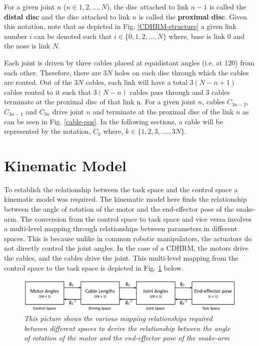 \documentclass[a4paper,12pt]{report}
\begin{document}
For a given joint $n$ ($n \in {1,2,\ldots,N}$), the disc attached to link $n-1$ is called the \textbf{distal disc} and the disc attached to link $n$ is called the \textbf{proximal disc}. Given this notation, note that as depicted in Fig. \ref{CDHRM-structure} a given link number $i$ can be denoted such that $i \in \{0,1,2,\ldots,N\}$ where, base is link $0$ and the nose is link $N$.


Each joint is driven by three cables placed at equidistant angles (i.e. at 120\textdegree) from each other. Therefore, there are $3N$ holes on each disc through which the cables are routed. Out of the $3N$ cables, each link will have a total $3(N-n+1)$ cables routed to it such that $3(N-n)$ cables pass through and $3$ cables terminate at the proximal disc of that link n. For a given joint $n$, cables $C_{3n-2}$,$C_{3n-1}$ and $C_{3n}$ drive joint $n$ and terminate at the proximal disc of the link $n$ as can be seen in Fig. \ref{cable-pos}. In the following sections, a cable will be represented by the notation, $C_{k}$ where, $k \in \{1,2,3,....,3N\}$.

\section{Kinematic Model}

To establish the relationship between the task space and the control space a kinematic model was required. The kinematic model here finds the relationship between the angle of rotation of the motor and the end-effector pose of the snake-arm. The conversion from the control space to task space and vice versa involves a multi-level mapping through relationships between parameters in different spaces. This is because unlike in common robotic manipulators, the actuators do not directly control the joint angles. In the case of a CDHRM, the motors drive the cables, and the cables drive the joint. This multi-level mapping from the control space to the task space is depicted in Fig. \ref{kinematic map} below.
\begin{figure}[h]
	\centering
	\includegraphics[width=\textwidth]{images/Kinematics-mapping.png}
	\caption{\textit{This picture shows the various mapping relationships required between different spaces to derive the relationship between the angle of rotation of the motor and the end-effector pose of the snake-arm}}
	\vspace{-30pt}
	\label{kinematic map}
\end{figure}
\end{document}
